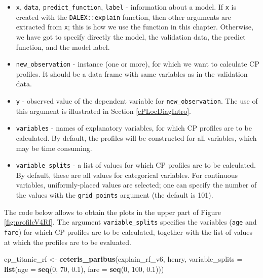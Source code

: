\documentclass[12pt,]{krantz}
\newenvironment{Shaded}{\begin{snugshade}}{\end{snugshade}}
\newcommand{\DataTypeTok}[1]{\textcolor[rgb]{0.13,0.29,0.53}{#1}}
\newcommand{\DecValTok}[1]{\textcolor[rgb]{0.00,0.00,0.81}{#1}}
\newcommand{\FloatTok}[1]{\textcolor[rgb]{0.00,0.00,0.81}{#1}}
\newcommand{\KeywordTok}[1]{\textcolor[rgb]{0.13,0.29,0.53}{\textbf{#1}}}
\newcommand{\NormalTok}[1]{#1}
\newcommand{\StringTok}[1]{\textcolor[rgb]{0.31,0.60,0.02}{#1}}
\providecommand{\tightlist}{%
  \setlength{\itemsep}{0pt}\setlength{\parskip}{0pt}}
\begin{document}
\begin{itemize}
\tightlist
\item
  \texttt{x}, \texttt{data}, \texttt{predict\_function}, \texttt{label} - information about a model. If \texttt{x} is created with the \texttt{DALEX::explain} function, then other arguments are extracted from \texttt{x}; this is how we use the function in this chapter. Otherwise, we have got to specify directly the model, the validation data, the predict function, and the model label.
\item
  \texttt{new\_observation} - instance (one or more), for which we want to calculate CP profiles. It should be a data frame with same variables as in the validation data.
\item
  \texttt{y} - observed value of the dependent variable for \texttt{new\_observation}. The use of this argument is illustrated in Section \ref{cPLocDiagIntro}.
\item
  \texttt{variables} - names of explanatory variables, for which CP profiles are to be calculated. By default, the profiles will be constructed for all variables, which may be time consuming.
\item
  \texttt{variable\_splits} - a list of values for which CP profiles are to be calculated. By default, these are all values for categorical variables. For continuous variables, uniformly-placed values are selected; one can specify the number of the values with the \texttt{grid\_points} argument (the default is 101).
\end{itemize}

The code below allows to obtain the plots in the upper part of Figure \ref{fig:profileV4Rf}. The argument \texttt{variable\_splits} specifies the variables (\texttt{age} and \texttt{fare}) for which CP profiles are to be calculated, together with the list of values at which the profiles are to be evaluated.

\begin{Shaded}
\begin{Highlighting}[]
\NormalTok{cp_titanic_rf <-}\StringTok{ }\KeywordTok{ceteris_paribus}\NormalTok{(explain_rf_v6, henry,}
              \DataTypeTok{variable_splits =} \KeywordTok{list}\NormalTok{(}\DataTypeTok{age =} \KeywordTok{seq}\NormalTok{(}\DecValTok{0}\NormalTok{, }\DecValTok{70}\NormalTok{, }\FloatTok{0.1}\NormalTok{),}
                                     \DataTypeTok{fare =} \KeywordTok{seq}\NormalTok{(}\DecValTok{0}\NormalTok{, }\DecValTok{100}\NormalTok{, }\FloatTok{0.1}\NormalTok{)))}
\end{Highlighting}
\end{Shaded}
\end{document}
